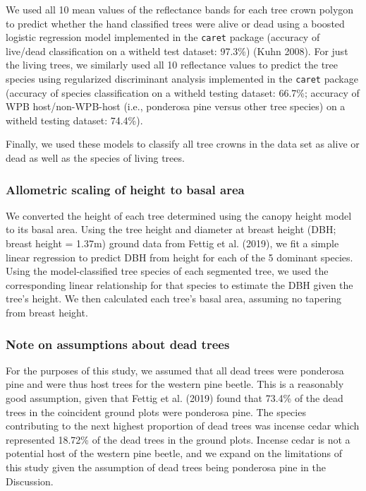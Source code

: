\documentclass[]{article}
\begin{document}
We used all 10 mean values of the reflectance bands for each tree crown
polygon to predict whether the hand classified trees were alive or dead
using a boosted logistic regression model implemented in the
\texttt{caret} package (accuracy of live/dead classification on a
witheld test dataset: 97.3\%) (Kuhn 2008). For just the living trees, we
similarly used all 10 reflectance values to predict the tree species
using regularized discriminant analysis implemented in the
\texttt{caret} package (accuracy of species classification on a witheld
testing dataset: 66.7\%; accuracy of WPB host/non-WPB-host (i.e.,
ponderosa pine versus other tree species) on a witheld testing dataset:
74.4\%).

Finally, we used these models to classify all tree crowns in the data
set as alive or dead as well as the species of living trees.

\subsubsection{Allometric scaling of height to basal
area}\label{allometric-scaling-of-height-to-basal-area}

We converted the height of each tree determined using the canopy height
model to its basal area. Using the tree height and diameter at breast
height (DBH; breast height = 1.37m) ground data from Fettig et al.
(2019), we fit a simple linear regression to predict DBH from height for
each of the 5 dominant species. Using the model-classified tree species
of each segmented tree, we used the corresponding linear relationship
for that species to estimate the DBH given the tree's height. We then
calculated each tree's basal area, assuming no tapering from breast
height.

\subsubsection{Note on assumptions about dead
trees}\label{note-on-assumptions-about-dead-trees}

For the purposes of this study, we assumed that all dead trees were
ponderosa pine and were thus host trees for the western pine beetle.
This is a reasonably good assumption, given that Fettig et al. (2019)
found that 73.4\% of the dead trees in the coincident ground plots were
ponderosa pine. The species contributing to the next highest proportion
of dead trees was incense cedar which represented 18.72\% of the dead
trees in the ground plots. Incense cedar is not a potential host of the
western pine beetle, and we expand on the limitations of this study
given the assumption of dead trees being ponderosa pine in the
Discussion.
\end{document}

